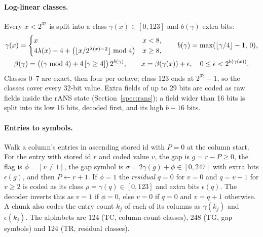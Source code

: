 \paragraph{Log-linear classes.}
Every $x<2^{32}$ is split into a class $\gamma(x)\in[0,123]$ and $b(\gamma)$ extra bits:
\begin{gather}
\gamma(x)=\begin{cases} x & x<8,\\ 4\lambda(x)-4+\left(\lfloor x/2^{\lambda(x)-2}\rfloor \bmod 4\right) & x\ge 8,\end{cases}
\qquad b(\gamma)=\max(\lfloor\gamma/4\rfloor-1,\,0),\notag\\
\beta(\gamma)=\bigl((\gamma\bmod 4)+4\,[\gamma\ge 4]\bigr)\,2^{b(\gamma)},\qquad x=\beta(\gamma(x))+\epsilon,\quad 0\le\epsilon<2^{b(\gamma(x))}.
\label{spec:eq:cls}
\end{gather}
Classes 0--7 are exact, then four per octave; class 123 ends at $2^{32}-1$, so the classes cover every 32-bit value. Extra fields of up to 29 bits are coded as raw fields inside the
rANS state (Section~\ref{spec:rans}); a field wider than 16 bits is split into its low 16 bits, decoded first, and its
high $b-16$ bits.

\paragraph{Entries to symbols.}
Walk a column's entries in ascending stored id with $P=0$ at the column start. For the entry with stored id $r$ and
coded value $v$, the gap is $g=r-P\ge0$, the flag is $\phi=[v\neq 1]$, the gap symbol is
$\sigma=2\gamma(g)+\phi\in[0,247]$ with extra bits $\epsilon(g)$, and then $P\leftarrow r+1$. If $\phi=1$ the
\emph{residual} $q=0$ for $v=0$ and $q=v-1$ for $v\ge2$ is coded as its class $\rho=\gamma(q)\in[0,123]$ and extra
bits $\epsilon(q)$. The decoder inverts this as $v=1$ if $\phi=0$, else $v=0$ if $q=0$ and $v=q+1$ otherwise. A chunk
also codes the entry count $k_j$ of each of its columns as $\gamma(k_j)$ and $\epsilon(k_j)$.
The alphabets are 124 (TC, column-count classes), 248 (TG, gap symbols) and 124 (TR, residual classes).

